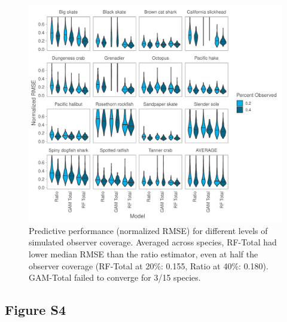 \documentclass[]{article}
\begin{document}
\begin{figure}[H]

{\centering \includegraphics[width=7in]{bycatch_sim_paper_supplement_files/figure-latex/coverage-effects-1} 

}

\caption[Predictive performance (normalized RMSE) for different levels of simulated observer coverage.]{Predictive performance (normalized RMSE) for different levels of simulated observer coverage. Averaged across species, RF-Total had lower median RMSE than the ratio estimator, even at half the observer coverage (RF-Total at 20\%: 0.155, Ratio at 40\%: 0.180). GAM-Total failed to converge for 3/15 species.}\label{fig:coverage-effects}
\end{figure}

\pagebreak

\subsection{Figure S4}\label{figure-s4}
\end{document}

